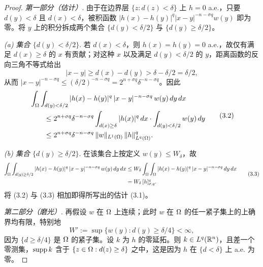 \begin{proof}
\emph{第一部分（估计）}. 由于在边界层 $\{z : d(z)<\delta\}$ 上 $h=0$ a.e.，只要 $d(y)<\delta$ 且 $d(x)<\delta$，被积函数 $|h(x)-h(y)|^q|x-y|^{-n-\sigma q}w(y)$ 即为零。将 $y$ 上的积分拆成两个集合 $\{d(y)<\delta/2\}$ 与 $\{d(y)\ge\delta/2\}$。

\emph{(a) 集合 $\{d(y)<\delta/2\}$}. 若 $d(x)<\delta$，则 $h(x)=h(y)=0$ a.e.，故仅有满足 $d(x)\ge\delta$ 的 $x$ 有贡献；对这种 $x$ 以及满足 $d(y)<\delta/2$ 的 $y$，距离函数的反向三角不等式给出
\[
  |x-y|\ge d(x)-d(y)>\delta-\delta/2=\delta/2 ,
\]
从而 $|x-y|^{-n-\sigma q}\le(\delta/2)^{-n-\sigma q}=2^{n+\sigma q}\delta^{-n-\sigma q}$。因此
\begin{equation}
\begin{split}
  &\int_\Omega\int_{d(y)<\delta/2} |h(x)-h(y)|^q\,|x-y|^{-n-\sigma q}\,w(y)\,dy\,dx \\
  &\qquad\le 2^{n+\sigma q}\delta^{-n-\sigma q}
  \int_{d(x)\ge\delta}|h(x)|^q\,dx\cdot\int_{d(y)<\delta/2}w(y)\,dy \\
  &\qquad\le 2^{n+\sigma q}\delta^{-n-\sigma q}\,\|w\|_{L^1(\Omega)}\,\|h\|^q_{L^q(\Omega)} .
\end{split}
  \tag{3.2}
\end{equation}

\emph{(b) 集合 $\{d(y)\ge\delta/2\}$}. 在该集合上按定义 $w(y)\le W_\delta$，故
\begin{equation}
\begin{split}
  \int_\Omega\int_{d(y)\ge\delta/2} |h(x)-h(y)|^q\,|x-y|^{-n-\sigma q}\,w(y)\,dy\,dx
  &\le W_\delta\int_\Omega\int_\Omega |h(x)-h(y)|^q\,|x-y|^{-n-\sigma q}\,dy\,dx \\
  &= W_\delta\,[h]^q_{\sigma,q} .
\end{split}
  \tag{3.3}
\end{equation}
将 (3.2) 与 (3.3) 相加即得所写出的估计 (3.1)。

\emph{第二部分（磨光）}. 再假设 $w$ 在 $\Omega$ 上连续；此时 $w$ 在 $\Omega$ 的任一紧子集上的上确界均有限，特别地
\[
  W':=\sup\{w(y) : d(y)\ge\delta/4\}<\infty ,
\]
因为 $\{d\ge\delta/4\}$ 是 $\Omega$ 的紧子集。设 $k$ 为 $h$ 的零延拓。则 $k\in L^q(\mathbb{R}^n)$，且差一个零测集，$\operatorname{supp} k$ 含于 $\{z\in\Omega : d(z)\ge\delta\}$ 之中，这是因为 $h$ 在 $\{d<\delta\}$ 上 a.e. 为零。


\end{proof}
